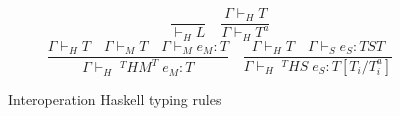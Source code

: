 \begin{figure}[p]
\[
\frac{}{\vdash_{H}L}
\quad
\frac{\Gamma\vdash_{H}T}{\Gamma\vdash_{H}T^{a}}
\]
\bigskip
\[
\frac{\Gamma\vdash_{H}T\quad\Gamma\vdash_{M}T\quad\Gamma\vdash_{M}e_{M}:T}{\Gamma\vdash_{H}\;^{T}HM^{T}\;e_{M}:T}
\quad
\frac{\Gamma\vdash_{H}T\quad\Gamma\vdash_{S}e_{S}:TST}{\Gamma\vdash_{H}\;^{T}HS\;e_{S}:T[T_{i}/T^{a}_{i}]}
\]
\caption{Interoperation Haskell typing rules}
\label{ihtr}
\end{figure}